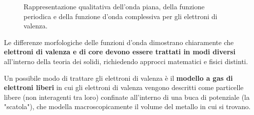 \begin{figure}[H]
    \centering
    \caption{Rappresentazione qualitativa dell'onda piana, della funzione periodica e della funzione d'onda complessiva per gli elettroni di valenza.}
    \label{fig:elettroni_valenza}
\end{figure}

Le differenze morfologiche delle funzioni d'onda dimostrano chiaramente che \textbf{elettroni di valenza e di core devono essere trattati in modi diversi} all'interno della teoria dei solidi, 
richiedendo approcci matematici e fisici distinti.

\begin{remark}
    Un possibile modo di trattare gli elettroni di valenza è il \textbf{modello a gas di elettroni liberi} in cui gli elettroni di valenza vengono descritti come particelle libere (non interagenti tra loro) confinate all'interno di una buca di potenziale (la "scatola"), che modella macroscopicamente il volume del metallo in cui si trovano.
\end{remark}

